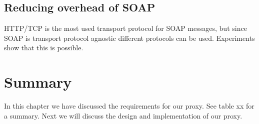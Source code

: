 \subsection{Reducing overhead of SOAP}
HTTP/TCP is the most used transport protocol for SOAP messages, but since SOAP is transport protocol agnostic different protocols can be used. Experiments show that this is possible.


\section{Summary}

In this chapter we have discussed the requirements for our proxy. See table xx for a summary. Next we will discuss the design and implementation of our proxy.
